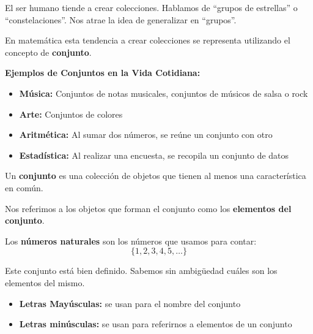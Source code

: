 


El ser humano tiende a crear colecciones. Hablamos de ``grupos de estrellas'' o ``constelaciones''. Nos atrae la idea de generalizar en ``grupos''.

En matemática esta tendencia a crear colecciones se representa utilizando el concepto de \textbf{conjunto}.

\begin{example}
\textbf{Ejemplos de Conjuntos en la Vida Cotidiana:}
\begin{itemize}
    \item \textbf{Música:} Conjuntos de notas musicales, conjuntos de músicos de salsa o rock
    \item \textbf{Arte:} Conjuntos de colores
    \item \textbf{Aritmética:} Al sumar dos números, se reúne un conjunto con otro
    \item \textbf{Estadística:} Al realizar una encuesta, se recopila un conjunto de datos
\end{itemize}
\end{example}


\begin{definition}
Un \textbf{conjunto} es una colección de objetos que tienen al menos una característica en común.

Nos referimos a los objetos que forman el conjunto como los \textbf{elementos del conjunto}.
\end{definition}

\begin{example}
Los \textbf{números naturales} son los números que usamos para contar:
$$\{1, 2, 3, 4, 5, \ldots\}$$

Este conjunto está bien definido. Sabemos sin ambigüedad cuáles son los elementos del mismo.
\end{example}


\begin{itemize}
    \item \textbf{Letras Mayúsculas:} se usan para el nombre del conjunto
    \item \textbf{Letras minúsculas:} se usan para referirnos a elementos de un conjunto
\end{itemize}

